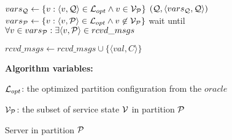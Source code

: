 \begin{algorithm}[htbp!]
\begin{distribalgo}[1]
\vspace{1.0mm}
		\STATE $vars_{\mathcal{Q}} \leftarrow \{v : \langle v, \mathcal{Q} \rangle \in \mathcal{L}_{opt} \wedge v \in \mathcal{V}_{\mathcal{P}} \}$
		\STATE \rmcast$(\mathcal{Q}, \langle vars_{\mathcal{Q}}, \mathcal{Q} \rangle )$
	\ENDFOR
	\STATE $vars_{\mathcal{P}} \leftarrow \{v : \langle v, \mathcal{P} \rangle \in \mathcal{L}_{opt} \wedge v \not\in \mathcal{V}_{\mathcal{P}} \}$
	\STATE wait until $\forall v \in vars_{\mathcal{P}}: \exists \langle v, \mathcal{P} \rangle \in rcvd\_msgs$
\ENDINDENT

\vspace{1.0mm}
    \STATE $rcvd\_msgs \leftarrow rcvd\_msgs \cup \{\langle val, C \rangle\}$
\ENDINDENT

\vspace{1.5mm}

\textbf{Algorithm variables:}

\vspace{1mm}

$\mathcal{L}_{opt}$: the optimized partition configuration from the $oracle$

$\mathcal{V}_{\mathcal{P}}$: the subset of service state $\mathcal{V}$ in partition $\mathcal{P}$


\caption{Server in partition $\mathcal{P}$}
\label{alg:dynastar-server_proxy}
\end{distribalgo}
\end{algorithm}
